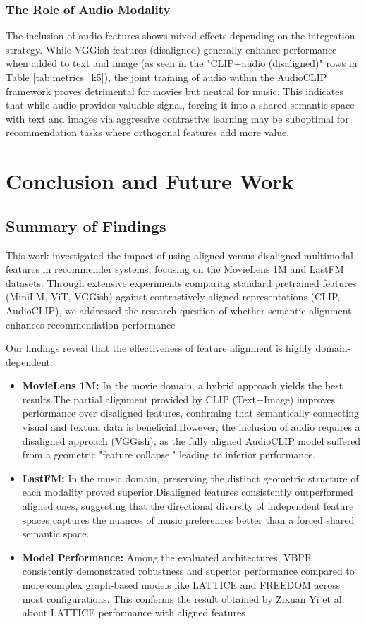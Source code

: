 \subsubsection{The Role of Audio Modality}
The inclusion of audio features shows mixed effects depending on the integration strategy. While VGGish features (disaligned) generally enhance performance when added to text and image (as seen in the "CLIP+audio (disaligned)" rows in Table \ref{tab:metrics_k5}), the joint training of audio within the AudioCLIP framework proves detrimental for movies but neutral for music. This indicates that while audio provides valuable signal, forcing it into a shared semantic space with text and images via aggressive contrastive learning may be suboptimal for recommendation tasks where orthogonal features add more value.

\newpage

\section{Conclusion and Future Work}

\subsection{Summary of Findings}
This work investigated the impact of using aligned versus disaligned multimodal features in recommender systems, focusing on the MovieLens 1M and LastFM datasets. Through extensive experiments comparing standard pretrained features (MiniLM, ViT, VGGish) against contrastively aligned representations (CLIP, AudioCLIP), we addressed the research question of whether semantic alignment enhances recommendation performance

Our findings reveal that the effectiveness of feature alignment is highly domain-dependent:
\begin{itemize}
    \item \textbf{MovieLens 1M:} In the movie domain, a hybrid approach yields the best results.The partial alignment provided by CLIP (Text+Image) improves performance over disaligned features, confirming that semantically connecting visual and textual data is beneficial.However, the inclusion of audio requires a disaligned approach (VGGish), as the fully aligned AudioCLIP model suffered from a geometric "feature collapse," leading to inferior performance.
    \item \textbf{LastFM:} In the music domain, preserving the distinct geometric structure of each modality proved superior.Disaligned features consistently outperformed aligned ones, suggesting that the directional diversity of independent feature spaces captures the nuances of music preferences better than a forced shared semantic space.
\item \textbf{Model Performance:} Among the evaluated architectures, VBPR consistently demonstrated robustness and superior performance compared to more complex graph-based models like LATTICE and FREEDOM across most configurations. This conferms the result obtained by Zixuan Yi et al. \cite{CLIPRecSys} about LATTICE performance with aligned features
\end{itemize}


